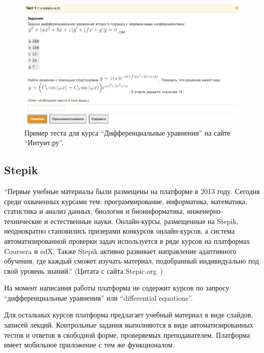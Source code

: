 \documentclass[14pt,russian]{extarticle}
\begin{document}

\begin{figure}[h!]
	\centering
		\includegraphics[height=.4\textheight]{img/Intuit/pic2.png}
	\caption{Пример теста для курса \enquote{Дифференциальные уравнения} на сайте \enquote{Интуит.ру}.}
	\label{img:Intuit:2}
\end{figure}

\subsection{Stepik}

\enquote{Первые учебные материалы были размещены на платформе в 2013 году. Сегодня среди охваченных курсами тем: программирование, информатика, математика, статистика 
и анализ данных, биология и биоинформатика, инженерно-технические и естественные науки. Онлайн-курсы, размещенные на Stepik, неоднократно становились призерами конкурсов онлайн-курсов, а система автоматизированной проверки задач используется 
в ряде курсов на платформах Coursera и edX. Также Stepik активно развивает направление адаптивного обучения, где каждый сможет изучать материал, подобранный индивидуально под свой уровень знаний.} (Цитата с сайта Stepic.org~\cite{cite:Stepik_about})

На момент написания работы платформа не содержит курсов по запросу \enquote{дифференциальные уравнения} или \enquote{differential equations}.

Для остальных курсов платформа предлагает учебный материал в виде слайдов, записей лекций. Контрольные задания выполняются в виде автоматизированных тестов и ответов в свободной форме, проверяемых преподавателем. Платформа имеет мобильное приложение с тем же функционалом.
\end{document}

